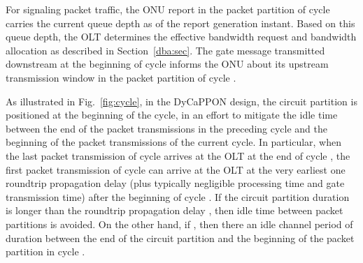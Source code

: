 \documentclass[article]{IEEEtran}
\begin{document}
For signaling packet traffic, the
ONU report in the packet partition of cycle  carries
the current queue depth as of the report generation instant.
Based on this queue depth, the OLT determines the effective
bandwidth request and bandwidth allocation as described in
Section~\ref{dba:sec}.
The gate message transmitted downstream at the
beginning of cycle  informs the ONU about its
upstream transmission window in the packet partition of
cycle .

As illustrated in Fig.~\ref{fig:cycle}, in the DyCaPPON design,
the circuit partition is positioned at the beginning of the cycle,
in an effort to mitigate the idle time between the
end of the packet transmissions in the preceding cycle
and the beginning of the packet transmissions of the current cycle.
In particular, when the last packet
transmission of cycle  arrives at the OLT at the
end of cycle , the first packet transmission of cycle 
can arrive at the OLT at the very earliest one roundtrip
propagation delay
(plus typically negligible processing time and gate transmission time)
after the beginning of cycle .
If the circuit partition duration  is longer than the
roundtrip propagation delay , then idle time between packet
partitions is avoided.
On the other hand, if , then there an idle
channel period of duration  between the end of
the circuit partition and the beginning of the packet
partition in cycle .
\end{document}
